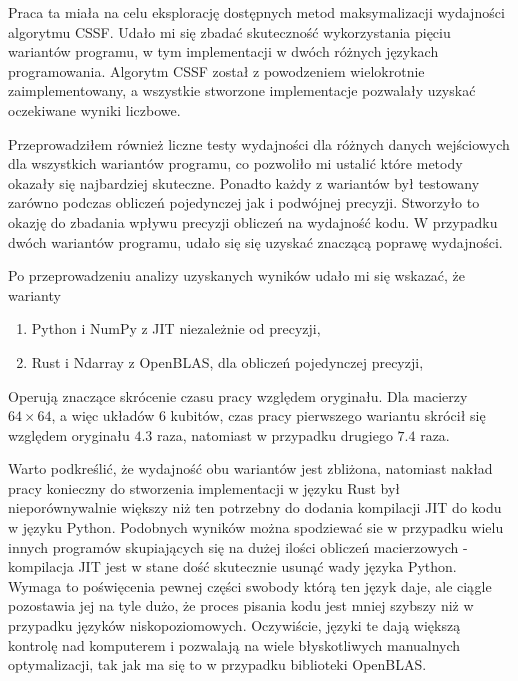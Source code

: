 \documentclass[11pt, a4paper]{article}
\begin{document}
\begin{sloppypar}
    Praca ta miała na celu eksplorację dostępnych metod maksymalizacji wydajności
    algorytmu CSSF. Udało mi się zbadać skuteczność wykorzystania pięciu wariantów programu,
    w tym implementacji w dwóch różnych językach programowania. Algorytm CSSF został z powodzeniem
    wielokrotnie zaimplementowany, a wszystkie stworzone implementacje pozwalały uzyskać
    oczekiwane wyniki liczbowe.

    Przeprowadziłem również liczne testy wydajności dla różnych danych wejściowych dla
    wszystkich wariantów programu, co pozwoliło mi ustalić które metody okazały się najbardziej
    skuteczne. Ponadto każdy z wariantów był testowany zarówno podczas obliczeń
    pojedynczej jak i podwójnej precyzji. Stworzyło to okazję do zbadania wpływu precyzji
    obliczeń na wydajność kodu. W przypadku dwóch wariantów programu, udało się się uzyskać
    znaczącą poprawę wydajności.

    Po przeprowadzeniu analizy uzyskanych wyników udało mi się wskazać, że warianty
    \begin{enumerate}
      \item Python i NumPy z JIT niezależnie od precyzji,

      \item Rust i Ndarray z OpenBLAS, dla obliczeń pojedynczej precyzji,
    \end{enumerate}

    Operują znaczące skrócenie czasu pracy względem oryginału. Dla macierzy $64\times64$,
    a więc układów 6 kubitów, czas pracy pierwszego wariantu skrócił się względem
    oryginału $4.3$ raza, natomiast w przypadku drugiego $7.4$ raza.

    Warto podkreślić, że wydajność obu wariantów jest zbliżona, natomiast nakład pracy konieczny
    do stworzenia implementacji w języku Rust był nieporównywalnie większy niż ten potrzebny
    do dodania kompilacji JIT do kodu w języku Python. Podobnych wyników można
    spodziewać sie w przypadku wielu innych programów skupiających się na dużej ilości
    obliczeń macierzowych - kompilacja JIT jest w stane dość skutecznie usunąć wady
    języka Python. Wymaga to poświęcenia pewnej części swobody którą ten język daje, ale
    ciągle pozostawia jej na tyle dużo, że proces pisania kodu jest mniej szybszy niż w przypadku
    języków niskopoziomowych. Oczywiście, języki te dają większą kontrolę nad komputerem
    i pozwalają na wiele błyskotliwych manualnych optymalizacji, tak jak ma się to w
    przypadku biblioteki OpenBLAS.


\end{sloppypar}
\end{document}
